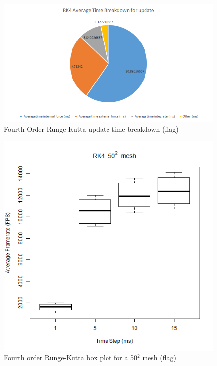     \begin{figure}
    \begin{center}
      \includegraphics[scale=.9]{Figures/flag_rk4_ut}
    \end{center}
    \caption{Fourth Order Runge-Kutta update time breakdown (flag)}
    \label{fig:rk4 ut flag}
  \end{figure}

\begin{figure}
    \begin{center}
      \includegraphics[scale=.9]{Figures/flag_rk4_50_box}
    \end{center}
    \caption{Fourth order Runge-Kutta box plot for a 50$^{2}$ mesh (flag)}
    \label{fig:rk4 box 50 flag}
  \end{figure}
  
